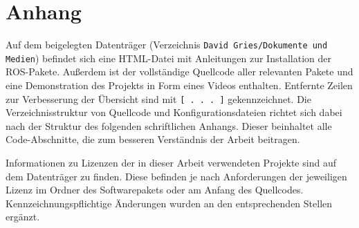 \part*{Anhang}
\appendixtoc

\vspace*{\fill}
Auf dem beigelegten Datenträger (Verzeichnis \lstinline{David Gries/Dokumente und Medien}) befindet sich eine HTML-Datei mit Anleitungen zur Installation der \ac{ROS}-Pakete. Außerdem ist der vollständige Quellcode aller relevanten Pakete und eine Demonstration des Projekts in Form eines Videos enthalten. Entfernte Zeilen zur Verbesserung der Übersicht sind mit \lstinline{[ . . . ]} gekennzeichnet. Die Verzeichnisstruktur von Quellcode und Konfigurationsdateien richtet sich dabei nach der Struktur des folgenden schriftlichen Anhangs. Dieser beinhaltet alle Code-Abschnitte, die zum besseren Verständnis der Arbeit beitragen.

Informationen zu Lizenzen der in dieser Arbeit verwendeten Projekte sind auf dem Datenträger zu finden. Diese befinden je nach Anforderungen der jeweiligen Lizenz im Ordner des Softwarepakets oder am Anfang des Quellcodes. Kennzeichnungspflichtige Änderungen wurden an den entsprechenden Stellen ergänzt.

\newpage
\overfullrule=0pt

